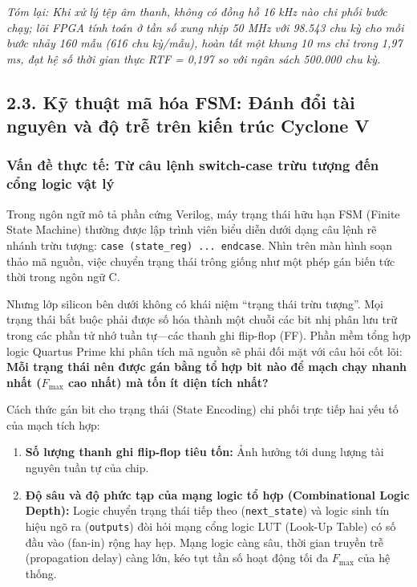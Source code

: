 \textit{Tóm lại: Khi xử lý tệp âm thanh, không có đồng hồ 16 kHz nào chi phối bước chạy; lõi FPGA tính toán ở tần số xung nhịp 50 MHz với 98.543 chu kỳ cho mỗi bước nhảy 160 mẫu (616 chu kỳ/mẫu), hoàn tất một khung 10 ms chỉ trong 1,97 ms, đạt hệ số thời gian thực RTF = 0,197 so với ngân sách 500.000 chu kỳ.}

\subsection*{2.3. Kỹ thuật mã hóa FSM: Đánh đổi tài nguyên và độ trễ trên kiến trúc Cyclone V}

\subsubsection*{Vấn đề thực tế: Từ câu lệnh switch-case trừu tượng đến cổng logic vật lý}
Trong ngôn ngữ mô tả phần cứng Verilog, máy trạng thái hữu hạn FSM (Finite State Machine) thường được lập trình viên biểu diễn dưới dạng câu lệnh rẽ nhánh trừu tượng: \texttt{case (state\_reg) ... endcase}. Nhìn trên màn hình soạn thảo mã nguồn, việc chuyển trạng thái trông giống như một phép gán biến tức thời trong ngôn ngữ C.

Nhưng lớp silicon bên dưới không có khái niệm ``trạng thái trừu tượng''. Mọi trạng thái bắt buộc phải được số hóa thành một chuỗi các bit nhị phân lưu trữ trong các phần tử nhớ tuần tự---các thanh ghi flip-flop (FF). Phần mềm tổng hợp logic Quartus Prime khi phân tích mã nguồn sẽ phải đối mặt với câu hỏi cốt lõi: \textbf{Mỗi trạng thái nên được gán bằng tổ hợp bit nào để mạch chạy nhanh nhất ($F_{\max}$ cao nhất) mà tốn ít diện tích nhất?}

Cách thức gán bit cho trạng thái (State Encoding) chi phối trực tiếp hai yếu tố của mạch tích hợp:
\begin{enumerate}[leftmargin=1.5em, itemsep=2pt]
    \item \textbf{Số lượng thanh ghi flip-flop tiêu tốn:} Ảnh hưởng tới dung lượng tài nguyên tuần tự của chip.
    \item \textbf{Độ sâu và độ phức tạp của mạng logic tổ hợp (Combinational Logic Depth):} Logic chuyển trạng thái tiếp theo (\texttt{next\_state}) và logic sinh tín hiệu ngõ ra (\texttt{outputs}) đòi hỏi mạng cổng logic LUT (Look-Up Table) có số đầu vào (fan-in) rộng hay hẹp. Mạng logic càng sâu, thời gian truyền trễ (propagation delay) càng lớn, kéo tụt tần số hoạt động tối đa $F_{\max}$ của hệ thống.
\end{enumerate}

